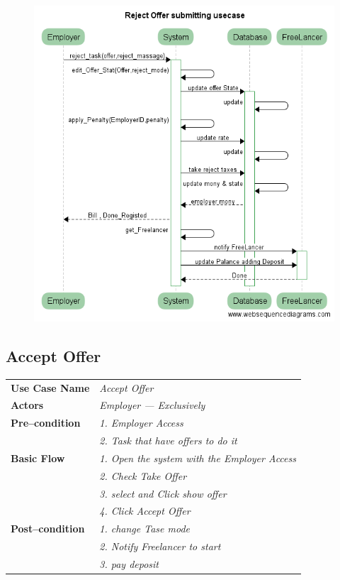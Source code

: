 \documentclass{article}
\begin{document}
\begin{figure}[ht!]
\centering
\includegraphics[width=128mm]{Reject_offer_submitting_usecase.png}
\end{figure}
\newpage

\subsection{Accept Offer}
    \begin{tabular}{ l | l }
    \toprule
      \rowcolor{LightCyan}
      \textbf{Use Case Name}    & \textit{Accept Offer}\\
      \textbf{Actors}           & \textit{Employer --- Exclusively}\\
      \rowcolor{LightCyan}
      \textbf{Pre--condition}   & \textit{1. Employer Access}\\
                                & \textit{2. Task that have offers to do it}\\
      \textbf{Basic Flow}       & \textit{1. Open the system with the Employer Access}\\
                                & \textit{2. Check Take Offer}\\
                                & \textit{3. select and Click show offer}\\
				& \textit{4. Click Accept Offer}\\

      \rowcolor{LightCyan}
      \textbf{Post--condition}  & \textit{1. change Tase mode}\\
                                & \textit{2. Notify Freelancer to start}\\
                                & \textit{3. pay deposit}\\
    \toprule
    \end{tabular}
\end{document}

